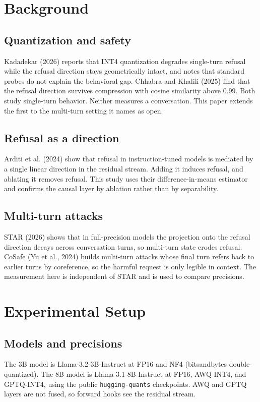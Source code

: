 \documentclass[10pt,twocolumn,letterpaper]{article}
\begin{document}
\section{Background}
\subsection{Quantization and safety}
Kadadekar (2026) reports that INT4 quantization degrades single-turn refusal while
the refusal direction stays geometrically intact, and notes that standard probes
do not explain the behavioral gap. Chhabra and Khalili (2025) find that the
refusal direction survives compression with cosine similarity above 0.99. Both
study single-turn behavior. Neither measures a conversation. This paper extends
the first to the multi-turn setting it names as open.

\subsection{Refusal as a direction}
Arditi et al. (2024) show that refusal in instruction-tuned models is mediated by
a single linear direction in the residual stream. Adding it induces refusal, and
ablating it removes refusal. This study uses their difference-in-means estimator
and confirms the causal layer by ablation rather than by separability.

\subsection{Multi-turn attacks}
STAR (2026) shows that in full-precision models the projection onto the refusal
direction decays across conversation turns, so multi-turn state erodes refusal.
CoSafe (Yu et al., 2024) builds multi-turn attacks whose final turn refers back to
earlier turns by coreference, so the harmful request is only legible in context.
The measurement here is independent of STAR and is used to compare precisions.

\section{Experimental Setup}
\subsection{Models and precisions}
The 3B model is Llama-3.2-3B-Instruct at FP16 and NF4 (bitsandbytes
double-quantized). The 8B model is Llama-3.1-8B-Instruct at FP16, AWQ-INT4, and
GPTQ-INT4, using the public \texttt{hugging-quants} checkpoints. AWQ and GPTQ
layers are not fused, so forward hooks see the residual stream.
\end{document}
